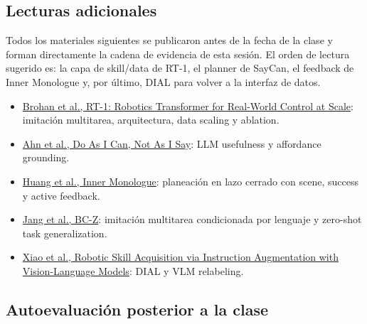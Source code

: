 \documentclass[a4paper]{article}
\begin{document}
\subsection{Lecturas adicionales}

Todos los materiales siguientes se publicaron antes de la fecha de la clase y forman directamente la cadena de evidencia de esta sesión. El orden de lectura sugerido es: la capa de skill/data de RT-1, el planner de SayCan, el feedback de Inner Monologue y, por último, DIAL para volver a la interfaz de datos.

\begin{itemize}
  \item \href{https://arxiv.org/abs/2212.06817}{Brohan et al., RT-1: Robotics Transformer for Real-World Control at Scale}: imitación multitarea, arquitectura, data scaling y ablation.
  \item \href{https://arxiv.org/abs/2204.01691}{Ahn et al., Do As I Can, Not As I Say}: LLM usefulness y affordance grounding.
  \item \href{https://arxiv.org/abs/2207.05608}{Huang et al., Inner Monologue}: planeación en lazo cerrado con scene, success y active feedback.
  \item \href{https://arxiv.org/abs/2202.02005}{Jang et al., BC-Z}: imitación multitarea condicionada por lenguaje y zero-shot task generalization.
  \item \href{https://arxiv.org/abs/2211.11736}{Xiao et al., Robotic Skill Acquisition via Instruction Augmentation with Vision-Language Models}: DIAL y VLM relabeling.
\end{itemize}

\subsection{Autoevaluación posterior a la clase}
\end{document}
